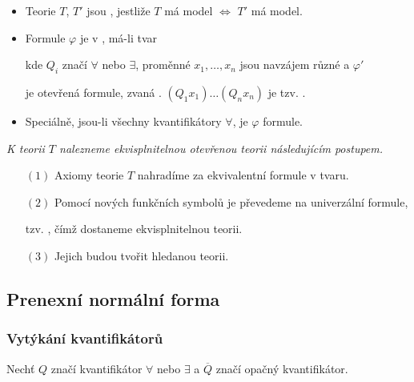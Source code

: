     \begin{itemize}
    \item Teorie $T$, $T'$ jsou , jestliže $T$ má model $\Leftrightarrow$ $T'$ má model.
    \smallskip
    
    \item Formule $\varphi$ je v , má-li tvar
    \vspace{-2mm}
    
    \vspace{-6mm}
    kde $Q_i$ značí $\forall$ nebo $\exists$, proměnné $x_1,\dots,x_n$ jsou navzájem různé a $\varphi'$
    \smallskip
    
    je otevřená formule, zvaná . $(Q_1x_1)\dots(Q_nx_n)$ je tzv. .
    \smallskip
    
    \item Speciálně, jsou-li všechny kvantifikátory $\forall$, je $\varphi$  formule.
    \end{itemize}
    \medskip
    
    {\it K teorii $T$ nalezneme ekvisplnitelnou otevřenou teorii následujícím postupem.}
    \vspace{0.5mm}
    
    \begin{enumerate}
    \item[$(1)$] Axiomy teorie $T$ nahradíme za ekvivalentní formule v  tvaru.
    \smallskip
    
    \item[$(2)$] Pomocí nových funkčních symbolů je převedeme na univerzální formule,
    \smallskip
    
    tzv. , čímž dostaneme ekvisplnitelnou teorii.
    \smallskip
    
    \item[$(3)$] Jejich  budou tvořit hledanou teorii.
    \end{enumerate}
    

\subsection{Prenexní normální forma}\todo

\subsubsection*{Vytýkání kvantifikátorů}
    Nechť $Q$ značí kvantifikátor $\forall$ nebo $\exists$ a $\overline{Q}$ značí opačný kvantifikátor.
    \smallskip
    
